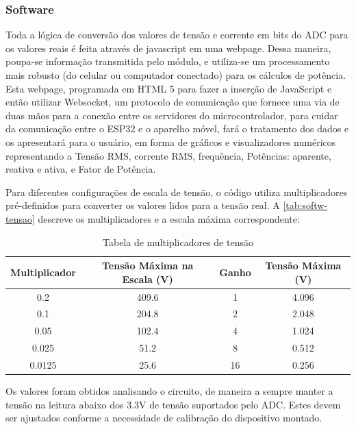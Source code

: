 \subsubsection{Software}\label{softwa}

Toda a lógica de conversão dos valores de tensão e corrente em bits do \gls{ADC} para os valores reais é feita através de javascript em uma webpage. Dessa maneira, poupa-se informação transmitida pelo módulo, e utiliza-se um processamento mais robusto (do celular ou computador conectado) para os cálculos de potência.
Esta webpage, programada em HTML 5 para fazer a inserção de JavaScript e então utilizar Websocket, um protocolo de comunicação que fornece uma via de duas mãos para a conexão entre os servidores do microcontrolador, para cuidar da comunicação entre o ESP32 e o aparelho móvel, fará o tratamento dos dados e os apresentará para o usuário, em forma de gráficos e visualizadores numéricos representando a Tensão RMS, corrente RMS, frequência, Potências: aparente, reativa e ativa, e Fator de Potência.

Para diferentes configurações de escala de tensão, o código utiliza multiplicadores pré-definidos para converter os valores lidos para a tensão real. A \autoref{tab:softw-tensao} descreve os multiplicadores e a escala máxima correspondente:

\begin{table}[h!]
    \centering
    \caption{Tabela de multiplicadores de tensão}
    \begin{tabular}{|c|c|c|c|}
        \hline
        \textbf{Multiplicador} & \textbf{Tensão Máxima na Escala (V)} & \textbf{Ganho} & \textbf{Tensão Máxima (V)} \\
        \hline
        0.2 & 409.6 & 1 & 4.096 \\
        0.1 & 204.8 & 2 & 2.048 \\
        0.05 & 102.4 & 4 & 1.024 \\
        0.025 & 51.2 & 8 & 0.512 \\
        0.0125 & 25.6 & 16 & 0.256 \\
        \hline
    \end{tabular}
    \label{tab:softw-tensao}
    \fonte{}
\end{table}

Os valores foram obtidos analisando o circuito, de maneira a sempre manter a tensão na leitura abaixo dos 3.3V de tensão suportados pelo \gls{ADC}. Estes devem ser ajustados conforme a necessidade de calibração do dispositivo montado.

